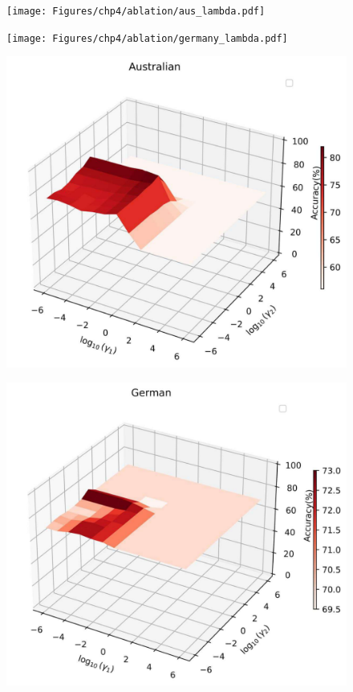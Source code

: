 \documentclass[12pt,a4paper,oneside,english]{report}
\begin{document}
\begin{figure}[t!]
    \begin{minipage}[t]{0.5\textwidth}
        \centering
        \texttt{[image: Figures/chp4/ablation/aus\_lambda.pdf]}
        \label{fig:aus_lambda}
    \end{minipage}%
    \begin{minipage}[t]{0.5\textwidth}
        \centering
        \texttt{[image: Figures/chp4/ablation/germany\_lambda.pdf]}
        \label{fig:german_lambda}
    \end{minipage}
    \vspace{0.5cm}

    \begin{minipage}[t]{0.5\textwidth}
        \centering
        \includegraphics[width=0.9\linewidth]{Figures/chp4/ablation/aus_gamma.pdf}
        \label{fig:aus_gamma}
    \end{minipage}%
    \begin{minipage}[t]{0.5\textwidth}
        \centering
        \includegraphics[width=0.9\linewidth]{Figures/chp4/ablation/german_gamma.pdf}

\end{minipage}
\end{figure}
\end{document}
